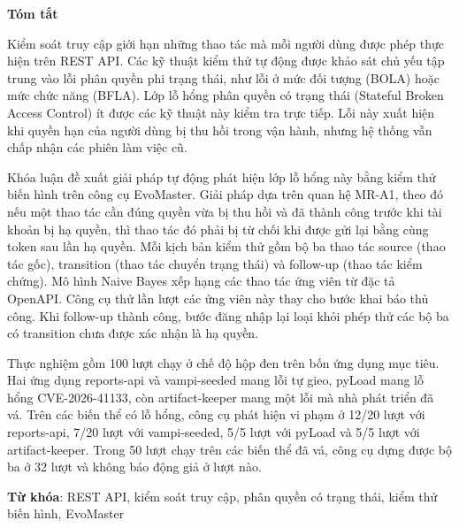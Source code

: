 \begin{center}
\textbf{\large{Tóm tắt}}
\end{center}


\begin{small}

Kiểm soát truy cập giới hạn những thao tác mà mỗi người dùng được phép thực hiện trên REST API. Các kỹ thuật kiểm thử tự động được khảo sát chủ yếu tập trung vào lỗi phân quyền phi trạng thái, như lỗi ở mức đối tượng (BOLA) hoặc mức chức năng (BFLA). Lớp lỗ hổng phân quyền có trạng thái (Stateful Broken Access Control) ít được các kỹ thuật này kiểm tra trực tiếp. Lỗi này xuất hiện khi quyền hạn của người dùng bị thu hồi trong vận hành, nhưng hệ thống vẫn chấp nhận các phiên làm việc cũ.

Khóa luận đề xuất giải pháp tự động phát hiện lớp lỗ hổng này bằng kiểm thử biến hình trên công cụ EvoMaster. Giải pháp dựa trên quan hệ MR-A1, theo đó nếu một thao tác cần đúng quyền vừa bị thu hồi và đã thành công trước khi tài khoản bị hạ quyền, thì thao tác đó phải bị từ chối khi được gửi lại bằng cùng token sau lần hạ quyền. Mỗi kịch bản kiểm thử gồm bộ ba thao tác source (thao tác gốc), transition (thao tác chuyển trạng thái) và follow-up (thao tác kiểm chứng). Mô hình Naive Bayes xếp hạng các thao tác ứng viên từ đặc tả OpenAPI. Công cụ thử lần lượt các ứng viên này thay cho bước khai báo thủ công. Khi follow-up thành công, bước đăng nhập lại loại khỏi phép thử các bộ ba có transition chưa được xác nhận là hạ quyền.

Thực nghiệm gồm 100 lượt chạy ở chế độ hộp đen trên bốn ứng dụng mục tiêu. Hai ứng dụng reports-api và vampi-seeded mang lỗi tự gieo, pyLoad mang lỗ hổng \mbox{CVE-2026-41133}, còn artifact-keeper mang một lỗi mà nhà phát triển đã vá. Trên các biến thể có lỗ hổng, công cụ phát hiện vi phạm ở 12/20 lượt với reports-api, 7/20 lượt với vampi-seeded, 5/5 lượt với pyLoad và 5/5 lượt với artifact-keeper. Trong 50 lượt chạy trên các biến thể đã vá, công cụ dựng được bộ ba ở 32 lượt và không báo động giả ở lượt nào.

\vspace*{1cm}
{\raggedright\textbf{Từ khóa}: REST API, kiểm soát truy cập, phân quyền có trạng thái, kiểm thử biến hình, EvoMaster\par}

\end{small}
